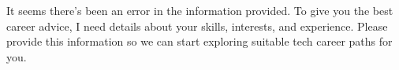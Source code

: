 It seems there's been an error in the information provided. To give you the best career advice, I need details about your skills, interests, and experience. Please provide this information so we can start exploring suitable tech career paths for you.